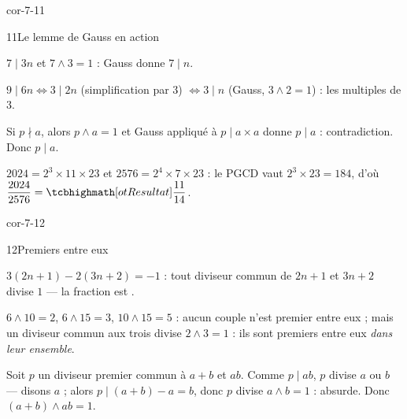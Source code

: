 \begin{blocLivre}{cor-7-11}
\begin{corrige}{11}{Le lemme de Gauss en action}
\begin{questions}
  \item $7\mid3n$ et $7\wedge3=1$ : Gauss donne $7\mid n$.
  \item $9\mid6n\iff3\mid2n$ (simplification par $3$)
    $\iff3\mid n$ (Gauss, $3\wedge2=1$) : les multiples de $3$.
  \item Si $p\nmid a$, alors $p\wedge a=1$ et Gauss appliqué à
    $p\mid a\times a$ donne $p\mid a$ : contradiction. Donc $p\mid a$.
  \item $2024=2^{3}\times11\times23$ et $2576=2^{4}\times7\times23$ :
    le PGCD vaut $2^{3}\times23=184$, d'où
    $\dfrac{2024}{2576}=\res{\dfrac{11}{14}}$.
\end{questions}
\end{corrige}
\end{blocLivre}

\begin{blocLivre}{cor-7-12}
\begin{corrige}{12}{Premiers entre eux}
\begin{questions}
  \item $3(2n+1)-2(3n+2)=-1$ : tout diviseur commun de $2n+1$ et $3n+2$
    divise $1$ — la fraction est .
  \item $6\wedge10=2$, $6\wedge15=3$, $10\wedge15=5$ : aucun couple n'est
    premier entre eux ; mais un diviseur commun aux trois divise $2\wedge3=1$ :
    ils sont premiers entre eux \emph{dans leur ensemble}.
  \item Soit $p$ un diviseur premier commun à $a+b$ et $ab$. Comme
    $p\mid ab$, $p$ divise $a$ ou $b$ — disons $a$ ; alors
    $p\mid(a+b)-a=b$, donc $p$ divise $a\wedge b=1$ : absurde. Donc
    $(a+b)\wedge ab=1$.
\end{questions}
\end{corrige}
\end{blocLivre}

